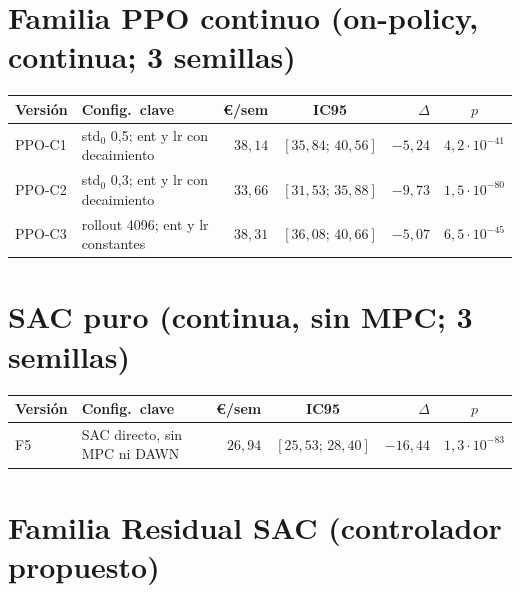 \documentclass[12pt, a4paper, twoside]{report}
\begin{document}
\section{Familia PPO continuo (on-policy, continua; 3 semillas)}

\begin{table}[H]
\centering\small
\begin{tabular}{llrcrc}
\toprule
\textbf{Versión} & \textbf{Config.\ clave} & \textbf{€/sem} & \textbf{IC95} &
\textbf{$\Delta$} & \textbf{$p$} \\
\midrule
PPO-C1 & std$_0$ 0{,}5; ent y lr con decaimiento & $38{,}14$ & $[35{,}84;\,40{,}56]$ & $-5{,}24$ & $4{,}2\cdot10^{-41}$ \\
PPO-C2 & std$_0$ 0{,}3; ent y lr con decaimiento & $33{,}66$ & $[31{,}53;\,35{,}88]$ & $-9{,}73$ & $1{,}5\cdot10^{-80}$ \\
PPO-C3 & rollout 4096; ent y lr constantes & $38{,}31$ & $[36{,}08;\,40{,}66]$ & $-5{,}07$ & $6{,}5\cdot10^{-45}$ \\
\bottomrule
\end{tabular}
\end{table}

\section{SAC puro (continua, sin MPC; 3 semillas)}

\begin{table}[H]
\centering\small
\begin{tabular}{llrcrc}
\toprule
\textbf{Versión} & \textbf{Config.\ clave} & \textbf{€/sem} & \textbf{IC95} &
\textbf{$\Delta$} & \textbf{$p$} \\
\midrule
F5 & SAC directo, sin MPC ni DAWN & $26{,}94$ & $[25{,}53;\,28{,}40]$ & $-16{,}44$ & $1{,}3\cdot10^{-83}$ \\
\bottomrule
\end{tabular}
\end{table}

\section{Familia Residual SAC (controlador propuesto)}
\end{document}
